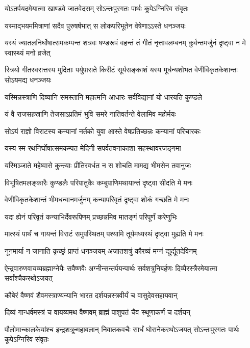 \twolineshloka
{योऽतर्पयदमेयात्मा खाण्डवे जातवेदसम्}
{सोऽन्तःपुरगतः पार्थः कूपेऽग्निरिव संवृतः}


\twolineshloka
{यस्माद्भयममित्राणां सदैव पुरुषर्षभात्}
{स लोकपरिभूतेन वेषेणाऽऽस्ते धनञ्जयः}


\threelineshloka
{यस्यं ज्यातलनिर्घोषात्समकम्पन्त शत्रवः}
{षण्डरूपं वहन्तं तं गीतं नृत्तावलम्बनम्}
{कुर्वन्तमर्जुनं दृष्ट्वा न मे स्वास्थ्यं मनो व्रजेत्}


\onelineshloka
{स्त्रियो गीतस्वरात्तस्य मुदिताः पर्युपासते}
\twolineshloka
{किरीटं सूर्यसङ्काशं यस्य मूर्धन्यशोभत}
{वेणीविकृतकेशान्तः सोऽयमद्य धनञ्जयः}


\twolineshloka
{यस्मिन्नस्त्राणि दिव्यानि समस्तानि महात्मनि}
{आधारः सर्वविद्यानां यो धारयति कुण्डले}


\twolineshloka
{यं वै राजसहस्राणि तेजसाऽप्रतिमं भुवि}
{समरे नातिवर्तन्ते वेलामिव महोर्मयः}


\twolineshloka
{सोऽयं राज्ञो विराटस्य कन्यानां नर्तको युवा}
{आस्ते वेषप्रतिच्छन्नः कन्यानां परिचारकः}


\twolineshloka
{यस्य स्म रथनिर्घोषात्समकम्पत मेदिनी}
{सपर्वतवनाकाशा सहस्थावरजङ्गमा}


\twolineshloka
{यस्मिञ्जाते महेष्वासे कुन्त्याः प्रीतिरवर्धत}
{न स शोचति मामद्य भीमसेन तवानुजः}


\twolineshloka
{विभूषितमलङ्कारैः कुण्डलैः परिपातुकैः}
{कम्बुपाणिमथायान्तं दृष्ट्वा सीदति मे मनः}


\twolineshloka
{वेणीविकृतकेशान्तं भीमधन्वानमर्जुनम्}
{कन्यापरिवृतं दृष्ट्वा शोकं गच्छति मे मनः}


\twolineshloka
{यदा ह्येनं परिवृतं कन्याभिर्देवरूपिणम्}
{प्रच्छन्नमिव मातङ्गं परिपूर्णं करेणुभिः}


\twolineshloka
{मात्स्यं पार्थं च गायन्तं विराटं समुपस्थितम्}
{पश्यामि तूर्यमध्यस्थं दृष्ट्वा मुह्यति मे मनः}


\twolineshloka
{नूनमार्या न जानाति कृच्छ्रं प्राप्तं धनञ्जयम्}
{अजातशत्रुं कौरव्यं मग्नं द्युर्द्यूतदेविनम्}


\threelineshloka
{ऐन्द्रवारुणवायव्यब्रह्माग्नेयैः सवैष्णवैः}
{अग्नीन्सन्तर्पयन्पार्थः सर्वशत्रुनिबर्हणः}
{दिव्यैरस्त्रैरमेयात्मा सर्वांश्चैकरथोऽजयत्}


\twolineshloka
{कौबेरं वैष्णवं शैवमस्त्राण्यन्यानि भारत}
{दर्शयन्नस्त्रवीर्यं च वासुदेवसहायवान्}


\twolineshloka
{दिव्यं गान्धर्वमस्त्रं च वायव्यमथ वैष्णवम्}
{ब्राह्मं पाशुपतं चैव स्थूणाकर्णं च दर्शयन्}


\threelineshloka
{पौलोमान्कालकेयांश्च इन्द्रशत्रून्महाबलान्}
{निवातकवचैः सार्धं घोरानेकरथोऽजयत्}
{सोऽन्तःपुरगतः पार्थः कूपेऽग्निरिव संवृतः}


